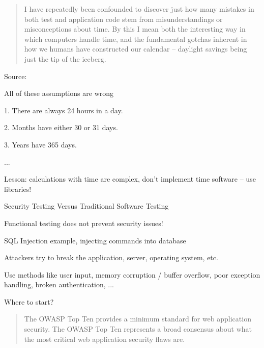 \documentclass[Screen16to9,17pt]{foils}
\begin{document}


\begin{quote}
I have repeatedly been confounded to discover just how many mistakes in both test and application code stem from misunderstandings or misconceptions about time. By this I mean both the interesting way in which computers handle time, and the fundamental gotchas inherent in how we humans have constructed our calendar – daylight savings being just the tip of the iceberg.
\end{quote}
Source: 

All of these assumptions are wrong
\begin{list2}
\item 1. There are always 24 hours in a day.
\item 2. Months have either 30 or 31 days.
\item 3. Years have 365 days.
\item ...
\end{list2}

\centerline{Lesson: calculations with time are complex, don't implement time software -- use libraries!}



\begin{list2}
\item Security Testing Versus Traditional Software Testing
\item Functional testing does not prevent security issues!
\item SQL Injection example, injecting commands into database
\item Attackers try to break the application, server, operating system, etc.
\item Use methods like user input, memory corruption / buffer overflow, poor exception handling, broken authentication, ...
\end{list2}

\vskip 2cm
\centerline{\LARGE Where to start?}



\begin{quote}
The OWASP Top Ten provides a minimum standard for web application
security. The OWASP Top Ten represents a broad consensus about what
the most critical web application security flaws are.
\end{quote}
\end{document}
